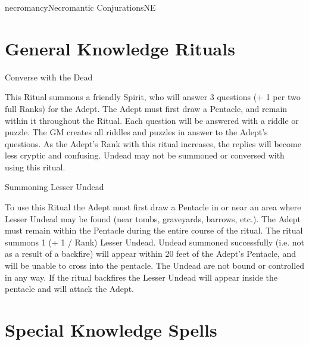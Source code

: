 \begin{College}[1.1]{necromancy}{Necromantic Conjurations}{NE}
\section{General Knowledge Rituals}

\begin{ritual}[Q-1]{Converse with the Dead}

\begin{effects}
This Ritual summons a friendly Spirit, who will answer 3 questions (+
1 per two full Ranks) for the Adept. The Adept must first draw a
Pentacle, and remain within it throughout the Ritual.  Each question
will be answered with a riddle or puzzle.  The GM creates all riddles
and puzzles in answer to the Adept’s questions.  As the Adept’s Rank
with this ritual increases, the replies will become less cryptic and
confusing.  Undead may not be summoned or conversed with using this
ritual.
\end{effects}
\end{ritual}

\begin{ritual}[Q-2]{Summoning Lesser Undead}

\begin{effects}
To use this Ritual the Adept must first draw a Pentacle in or near an
area where Lesser Undead may be found (near tombs, graveyards,
barrows, etc.).  The Adept must remain within the Pentacle during the
entire course of the ritual. The ritual summons 1 (+ 1 / Rank) Lesser
Undead.  Undead summoned successfully (i.e. not as a result of a
backfire) will appear within 20 feet of the Adept’s Pentacle, and will
be unable to cross into the pentacle.  The Undead are not bound or
controlled in any way. If the ritual backfires the Lesser Undead will
appear inside the pentacle and will attack the Adept.
\end{effects}
\end{ritual}

\section{Special Knowledge Spells}


\end{College}
